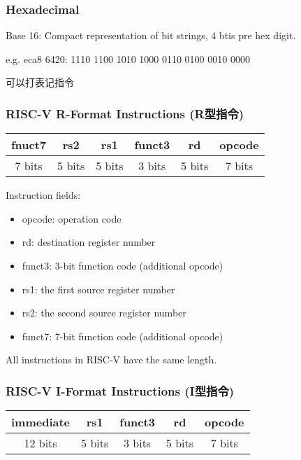 \subsubsection{Hexadecimal}
Base 16: Compact representation of bit strings, 4 btis pre hex digit. 

e.g. eca8 6420: 1110 1100 1010 1000 0110 0100 0010 0000

可以打表记指令
\subsubsection{RISC-V R-Format Instructions (R型指令)}
\begin{table}[!htb]
    \centering
    \begin{tabular}[c]{|c|c|c|c|c|c|}\hline
        fnuct7 & rs2 & rs1 & funct3 & rd & opcode \\ \hline
        7 bits & 5 bits & 5 bits & 3 bits & 5 bits &7 bits \\ \hline
    \end{tabular}
\end{table}

Instruction fields:
\begin{itemize}
    \item opcode: operation code
    \item rd: destination register number
    \item funct3: 3-bit function code (additional opcode)
    \item rs1: the first source register number
    \item rs2: the second source register number
    \item funct7: 7-bit function code (additional opcode)
\end{itemize}
All instructions in RISC-V have the same length. 

\subsubsection{RISC-V I-Format Instructions (I型指令)}
\begin{table}[!htb]
    \centering
    \begin{tabular}[c]{|c|c|c|c|c|}\hline
        immediate & rs1 & funct3 & rd & opcode \\ \hline
        12 bits & 5 bits & 3 bits & 5 bits &7 bits \\ \hline
    \end{tabular}
\end{table}

